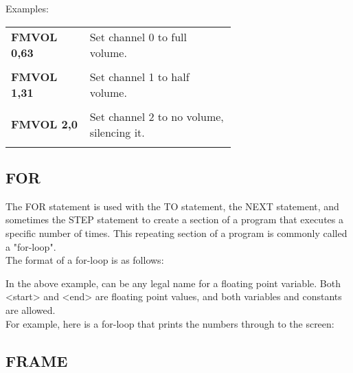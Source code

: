 Examples:\\

\begin{tabular}{l p{0.65\linewidth}}

	{\ttfamily\bfseries FMVOL 0,63}&Set channel 0 to full volume.\\\\

	{\ttfamily\bfseries FMVOL 1,31}&Set channel 1 to half volume.\\\\

	{\ttfamily\bfseries FMVOL 2,0}&Set channel 2 to no volume, silencing it.\\\\

\end{tabular}

\subsection{FOR}

The {\ttfamily FOR} statement is used with the {\ttfamily TO} statement, the
{\ttfamily NEXT} statement, and sometimes the {\ttfamily STEP} statement to
create a section of a program that executes a specific number of times.  This
repeating section of a program is commonly called a "for-loop".\\

The format of a for-loop is as follows:\\


In the above example, {} can be any legal name for a
floating point variable.  Both {\ttfamily <start>} and {\ttfamily <end>} are
floating point values, and both variables and constants are allowed.\\

For example, here is a for-loop that prints the numbers {} through
{} to the screen:\\


\subsection{FRAME}

